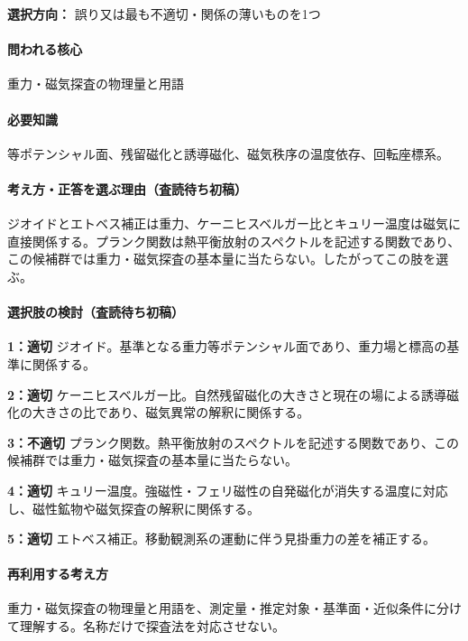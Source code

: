 \noindent\textbf{選択方向：} 誤り又は最も不適切・関係の薄いものを1つ\par

\paragraph{問われる核心} 重力・磁気探査の物理量と用語

\paragraph{必要知識} 等ポテンシャル面、残留磁化と誘導磁化、磁気秩序の温度依存、回転座標系。

\paragraph{考え方・正答を選ぶ理由（査読待ち初稿）} ジオイドとエトベス補正は重力、ケーニヒスベルガー比とキュリー温度は磁気に直接関係する。プランク関数は熱平衡放射のスペクトルを記述する関数であり、この候補群では重力・磁気探査の基本量に当たらない。したがってこの肢を選ぶ。

\paragraph{選択肢の検討（査読待ち初稿）}\mbox{}\par

\noindent\textbf{1：適切} ジオイド。基準となる重力等ポテンシャル面であり、重力場と標高の基準に関係する。\par

\noindent\textbf{2：適切} ケーニヒスベルガー比。自然残留磁化の大きさと現在の場による誘導磁化の大きさの比であり、磁気異常の解釈に関係する。\par

\noindent\textbf{3：不適切} プランク関数。熱平衡放射のスペクトルを記述する関数であり、この候補群では重力・磁気探査の基本量に当たらない。\par

\noindent\textbf{4：適切} キュリー温度。強磁性・フェリ磁性の自発磁化が消失する温度に対応し、磁性鉱物や磁気探査の解釈に関係する。\par

\noindent\textbf{5：適切} エトベス補正。移動観測系の運動に伴う見掛重力の差を補正する。\par

\paragraph{再利用する考え方} 重力・磁気探査の物理量と用語を、測定量・推定対象・基準面・近似条件に分けて理解する。名称だけで探査法を対応させない。

